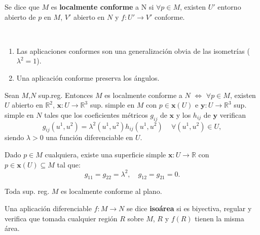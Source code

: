 \documentclass[twoside]{report}
\begin{document}
\begin{defi}
Se dice que $M$ es \textbf{localmente conforme} a N si $\forall p \in M$, existen $U'$ entorno abierto de $p$ en $M$, $V'$ abierto en $N$ y $f: U' \rightarrow V'$ conforme.
\end{defi}

\begin{nota}

\

\begin{enumerate}
\item Las aplicaciones conformes son una generalización obvia de las isometrías ($\lambda^2=1$).
\item Una aplicación conforme preserva los ángulos.
\end{enumerate}
\end{nota}

\begin{teorema}
Sean $M$,$N$ sup.reg. Entonces $M$ es localmente conforme a $N$ $\Leftrightarrow$ $\forall p \in M$, existen $U$ abierto en $\mathbb{R}^2$, $\textbf{x}: U\rightarrow \mathbb{R}^3$ sup. simple en $M$ con $p\in \textbf{x}(U)$ e $\textbf{y}: U\rightarrow \mathbb{R}^3$ sup. simple en $N$ tales que los coeficientes métricos $g_{ij}$ de $\textbf{x}$ y los $h_{ij}$ de $\textbf{y}$ verifican
$$ g_{ij}(u^1,u^2) = \lambda^2(u^1,u^2)h_{ij}(u^1,u^2) \, \, \, \, \, \, \, \forall (u^1,u^2)\in U,$$
siendo $\lambda > 0$ una función diferenciable en $U$.

\end{teorema}

\begin{teorema}
Dado $p \in M$ cualquiera, existe una superficie simple $\textbf{x}: U\longrightarrow \mathbb{R}$ con $ p\in \textbf{x}(U) \subseteq M $ tal que:
$$g_{11}= g_{22}= \lambda^2, \quad g_{12}=g_{21}=0.$$
\end{teorema}

\begin{coro}
Toda sup. reg. $M$ es localmente conforme al plano.
\end{coro}

\begin{defi}
Una aplicación diferenciable $ f: M\longrightarrow N$ se dice \textbf{isoárea} si es biyectiva, regular y verifica que tomada cualquier región $R$ sobre $M$, $R$ y $f(R)$ tienen la misma área.
\end{defi}
\end{document}
